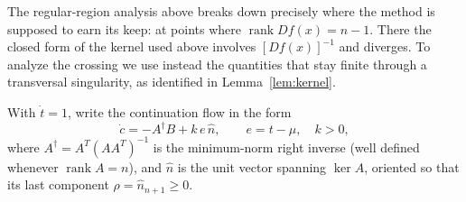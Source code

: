 \documentclass[11pt,american]{article}
\DeclareMathOperator{\rank}{\operatorname{rank}}
\theoremstyle{definition}
\theoremstyle{plain}
\theoremstyle{remark}
\begin{document}
The regular-region analysis above breaks down precisely where the method is supposed to earn its keep: at points where $\rank D f(x) = n-1$. There the closed form of the kernel used above involves $[Df(x)]^{-1}$ and diverges. To analyze the crossing we use instead the quantities that stay finite through a transversal singularity, as identified in Lemma~\ref{lem:kernel}.

With $\dot t = 1$, write the continuation flow in the form
\begin{equation}\label{flow}
\dot c = -A^\dagger B + k\, e\, \hat n, \qquad e = t - \mu, \quad k > 0,
\end{equation}
where $A^\dagger = A^T (A A^T)^{-1}$ is the minimum-norm right inverse (well defined whenever $\rank A = n$), and $\hat n$ is the unit vector spanning $\ker A$, oriented so that its last component $\rho = \hat n_{n+1} \ge 0$.
\end{document}
